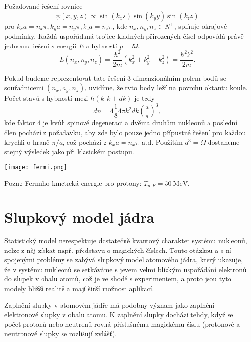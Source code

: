 \documentclass[../../main.tex]{subfiles}
\begin{document}
Požadované řešení rovnice
\begin{equation}
\psi (x,y,z) \propto \sin(k_x s) \sin (k_y y) \sin(k_z z)
\end{equation}
pro $k_x a = n_x \pi, k_y a = n_y \pi, k_z a = n_z \pi$, kde $n_x, n_y, n_z \in N^+$, splňuje okrajové podmínky. Každá uspořádaná trojice kladných přirozených čísel odpovídá právě jednomu řešení s energií $E$ a hybností $p = \hbar k$
\begin{equation}
E(n_x,n_y,n_z) = \dfrac{\hbar ^2}{2m} (k_{x}^2 + k_{y}^2 + k_{z}^2) = \dfrac{\hbar ^2 k^2}{2m}.
\end{equation}

Pokud budeme reprezentovat tato řešení 3-dimenzionálním polem bodů se souřadnicemi $(n_x, n_y, n_z)$, uvidíme, že tyto body leží na povrchu oktantu koule. Počet stavů s hybností mezi $\hbar (k; k + dk)$ je tedy 
\begin{equation}
dn = 4 \dfrac{1}{8} 4 \pi k^2 dk \left( \dfrac{a}{\pi}\right) ^3, 
\end{equation}
kde faktor 4 je kvůli spinové degeneraci a dvěma druhům nukleonů a poslední člen pochází z požadavku, aby zde bylo pouze jedno přípustné řešení pro každou krychli o hraně $\pi/a$, což pochází z $k_x a = n_x \pi$ atd. Použitím $a^3 = \Omega $ dostaneme stejný výsledek jako při klasickém  postupu. 


\begin{center}
	\texttt{[image: fermi.png]}
\end{center}

Pozn.: Fermiho kinetická energie pro protony: $T_{p,F} \dot{=} 30 ~\mathrm{MeV}$.

\section{Slupkový model jádra}

Statistický model nerespektuje dostatečně kvantový charakter systému nukleonů, nelze z něj získat např. představu o magických číslech. Touto otázkou a  s ní spojenými problémy se zabývá slupkový model atomového jádra, který ukazuje, že v systému nukleonů se setkáváme s jevem velmi blízkým uspořádání elektronů do slupek v obalu atomů, což je ve shodě s experimentem, a proto jsou tyto modely bližší realitě a mají širší možnost aplikací. 

Zaplnění slupky v atomovém jádře má podobný význam jako zaplnění elektronové slupky v obalu atomu. K zaplnění slupky dochází tehdy, když se počet protonů nebo neutronů rovná příslušnému magickému číslu (protonové a neutronové slupky se rozlišují zvlášť).
\end{document}
